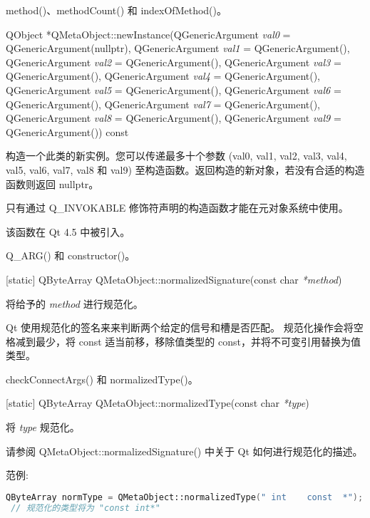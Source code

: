 \begin{notice}[另请参阅]
method()、methodCount() 和 indexOfMethod()。
\end{notice}

QObject *QMetaObject::newInstance(QGenericArgument \emph{val0} = QGenericArgument(nullptr), QGenericArgument \emph{val1} = QGenericArgument(), 
    QGenericArgument \emph{val2} = QGenericArgument(), QGenericArgument \emph{val3} = QGenericArgument(), 
    QGenericArgument \emph{val4} = QGenericArgument(), QGenericArgument \emph{val5} = QGenericArgument(), 
    QGenericArgument \emph{val6} = QGenericArgument(), QGenericArgument \emph{val7} = QGenericArgument(), 
    QGenericArgument \emph{val8} = QGenericArgument(), QGenericArgument \emph{val9} = QGenericArgument()) const

构造一个此类的新实例。您可以传递最多十个参数 (val0, val1, val2, val3, val4, val5, val6, val7, val8 和 val9) 至构造函数。返回构造的新对象，若没有合适的构造函数则返回 nullptr。

\begin{notice}
只有通过 Q\_INVOKABLE 修饰符声明的构造函数才能在元对象系统中使用。
\end{notice}

该函数在 Qt 4.5 中被引入。

\begin{notice}[另请参阅]
Q\_ARG() 和 constructor()。
\end{notice}

[static] QByteArray QMetaObject::normalizedSignature(const char \emph{*method})

将给予的 \emph{method} 进行规范化。

Qt 使用规范化的签名来来判断两个给定的信号和槽是否匹配。
规范化操作会将空格减到最少，将 const 适当前移，移除值类型的 const，并将不可变引用替换为值类型。

\begin{notice}[另请参阅]
checkConnectArgs() 和 normalizedType()。
\end{notice}

[static] QByteArray QMetaObject::normalizedType(const char \emph{*type})

将 \emph{type} 规范化。

请参阅 QMetaObject::normalizedSignature() 中关于 Qt 如何进行规范化的描述。

范例:

\begin{lstlisting}[language=C++]
 QByteArray normType = QMetaObject::normalizedType(" int    const  *");
 // 规范化的类型将为 "const int*"
\end{lstlisting}

